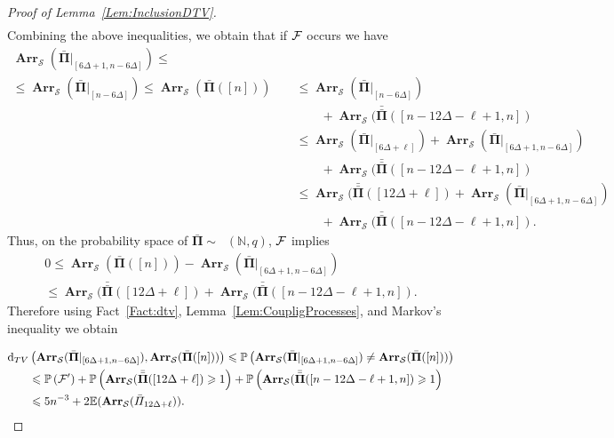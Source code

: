 \documentclass[letterpaper,11pt]{article}
\theoremstyle{definition}
\theoremstyle{remark}
\renewcommand{\le}{\leqslant}
\renewcommand{\ge}{\geqslant}
\DeclareMathOperator{\Mallows}{Mallows_{seq}}
\newcommand{\bE}{\mathbb{E}}
\newcommand{\Arr}{\ensuremath{\operatorname{\mathbf{Arr}}}}
\newcommand{\Pra}[1]{\mathbb{P}\left(#1\right)}
\newcommand{\barpi}{\bar \varPi}
\newcommand{\barPi}{\bar {\mathbf \Pi}}
\newcommand{\barbarPi}{{\bar{\bar {\mathbf \Pi}}}}
\newcommand{\NN}{\mathbb{N}}
\newcommand{\cS}{\mathcal{S}}
\newcommand{\dtv}{\operatorname{d}_{TV}}
\begin{document}
\begin{proof}[Proof of Lemma~\ref{Lem:InclusionDTV}]
\begin{align*}
	\end{align*}
	Combining the above inequalities, we obtain that if ${\cal F}$ occurs we have
	\begin{align}\nonumber
		\Arr_{\cS}(\barPi|_{[6\Delta+1,n-6\Delta]})\le\phantom{ \Arr_{\cS}(\barPi([n]))}&\\ 
		\le  \Arr_{\cS}(\barPi|_{[n-6\Delta]})
		\nonumber
		\le \Arr_{\cS}(\barPi([n]))
		&\le \Arr_{\cS}(\barPi|_{[n-6\Delta]})\\
		\nonumber &\quad\quad +\Arr_{\cS}(\barbarPi([n-12\Delta-\ell+1,n])
		\\ \nonumber
		&\le \Arr_{\cS}(\barPi|_{[6\Delta+\ell]}) + \Arr_{\cS}(\barPi|_{[6\Delta+1,n-6\Delta]})
		\\ \nonumber &\quad\quad + \Arr_{\cS}(\barbarPi([n-12\Delta-\ell+1,n])
		\\ \nonumber
		&\le 
		\Arr_{\cS}(\barbarPi([12\Delta+\ell])+\Arr_{\cS}(\barPi|_{[6\Delta+1,n-6\Delta]})\\
		&\quad\quad+\Arr_{\cS}(\barbarPi([n-12\Delta-\ell+1,n]).
		\label{Eq:InclusionDtv:inequalities}
	\end{align}
	Thus, on the probability space of $\barPi\sim \Mallows(\NN,q)$, ${\cal F}$ implies 
	\begin{multline}%
		0
		\le 
		\Arr_{\cS}(\barPi([n]))-\Arr_{\cS}(\barPi|_{[6\Delta+1,n-6\Delta]})\\
		\le
		\Arr_{\cS}(\barbarPi([12\Delta+\ell])+\Arr_{\cS}(\barbarPi([n-12\Delta-\ell+1,n]).
	\end{multline}
	Therefore using Fact~\ref{Fact:dtv}, Lemma~\ref{Lem:CoupligProcesses}, and Markov's inequality we obtain
	
	\[
	\begin{split}
		\dtv&\left(\Arr_{\cS}(\barPi|_{[6\Delta+1,n-6\Delta]}),\Arr_{\cS}(\barPi([n]))\right)
		\le 
		\Pra{\Arr_{\cS}(\barPi|_{[6\Delta+1,n-6\Delta]})\neq\Arr_{\cS}(\barPi([n]))}\\
		&\le 
		\Pra{{\cal F}'}+\Pra{\Arr_{\cS}(\barbarPi([12\Delta+\ell])\ge 1}+\Pra{\Arr_{\cS}(\barbarPi([n-12\Delta-\ell+1,n])\ge 1}\\
		&\le 5n^{-3}+2\bE(\Arr_{\cS}(\barpi_{12\Delta+\ell})).
	\end{split}
	\]
\end{proof}
\end{document}
